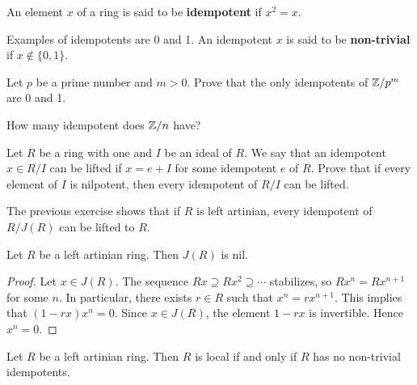 \begin{definition}
    An element $x$ of a ring is said to be \textbf{idempotent} 
    if $x^2=x$.   
\end{definition}

Examples of idempotents are 0 and 1. 
An idempotent $x$ is said to be \textbf{non-trivial} if $x\not\in\{0,1\}$. 

\begin{exercise}
\label{xca:idempotents_modpm}
    Let $p$ be a prime number and $m>0$. 
    Prove that the only idempotents of $\mathbb{Z}/p^m$ are 0 and 1. 
\end{exercise}


\begin{exercise}
    \label{xca:idempotents_modn}
    How many idempotent does $\mathbb{Z}/n$ have?
\end{exercise}

\begin{exercise}
\label{xca:lifting_idempotents}
    Let $R$ be a ring with one and $I$ be an ideal of $R$. 
    We say that an idempotent $x\in R/I$ can be lifted if $x=e+I$ for
    some idempotent $e$ of $R$. 
    Prove that if every element of $I$ is nilpotent, then every 
    idempotent of $R/I$ can be lifted. 
\end{exercise}

The previous exercise shows that if $R$ is left artinian, 
every idempotent of $R/J(R)$ can be lifted to $R$. 

\begin{lemma}
\label{lem:J(R)_nil}
    Let $R$ be a left artinian ring. Then $J(R)$ is nil. 
\end{lemma}

\begin{proof}
    Let $x\in J(R)$. The sequence $Rx\supseteq Rx^2\supseteq\cdots$ stabilizes, so
    $Rx^n=Rx^{n+1}$ for some $n$. In particular, there exists $r\in R$ 
    such that $x^n=rx^{n+1}$. This implies that $(1-rx)x^n=0$. Since $x\in J(R)$, 
    the element $1-rx$ is invertible. Hence $x^n=0$.  
\end{proof}

\begin{theorem}
\label{thm:local_idempotent}
    Let $R$ be a left artinian ring. Then $R$ is local if and only if 
    $R$ has no non-trivial idempotents. 
\end{theorem}

